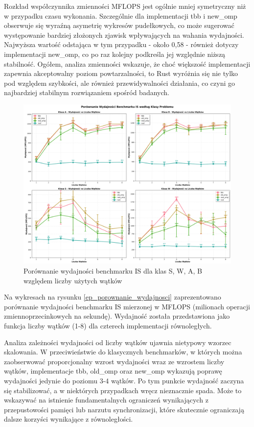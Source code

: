 Rozkład współczynnika zmienności MFLOPS jest ogólnie mniej symetryczny niż w przypadku czasu wykonania. Szczególnie dla implementacji tbb i new\_omp obserwuje się wyraźną asymetrię wykresów pudełkowych, co może sugerować występowanie bardziej złożonych zjawisk wpływających na wahania wydajności. Najwyższa wartość odstająca w tym przypadku - około 0,58 - również dotyczy implementacji new\_omp, co po raz kolejny podkreśla jej względnie niższą stabilność. Ogółem, analiza zmienności wskazuje, że choć większość implementacji zapewnia akceptowalny poziom powtarzalności, to Rust wyróżnia się nie tylko pod względem szybkości, ale również przewidywalności działania, co czyni go najbardziej stabilnym rozwiązaniem spośród badanych.
\begin{figure}[H]
    \centering
    \includegraphics[width=\textwidth]{analiza/images/parallel/is/arm/is_porownanie_wydajnosci.png}
    \caption{Porównanie wydajności benchmarku IS dla klas S, W, A, B względem liczby użytych wątków}
    \label{is_porownanie_wydajnosci}
\end{figure}
Na wykresach na rysunku \ref{ep_porownanie_wydajnosci} zaprezentowano porównanie wydajności benchmarku IS mierzonej w MFLOPS (milionach operacji zmiennoprzecinkowych na sekundę). Wydajność została przedstawiona jako funkcja liczby wątków (1-8) dla czterech implementacji równoległych.

Analiza zależności wydajności od liczby wątków ujawnia nietypowy wzorzec skalowania. W przeciwieństwie do klasycznych benchmarków, w których można zaobserwować proporcjonalny wzrost wydajności wraz ze wzrostem liczby wątków, implementacje tbb, old\_omp oraz new\_omp wykazują poprawę wydajności jedynie do poziomu 3-4 wątków. Po tym punkcie wydajność zaczyna się stabilizować, a w niektórych przypadkach wręcz nieznacznie spada. Może to wskazywać na istnienie fundamentalnych ograniczeń wynikających z przepustowości pamięci lub narzutu synchronizacji, które skutecznie ograniczają dalsze korzyści wynikające z równoległości.

